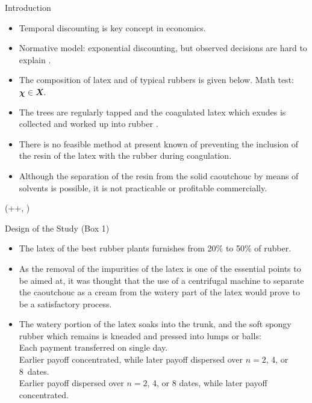 \documentclass{beamer}
\newlength{\blockThree}
\newcommand{\balA}[1][1]{BAL$^\mathup{I}_{#1:#1}$\xspace}
\newcommand{\unbalA}[1][n]{UNBAL$^\mathup{I}_{1:#1}$\xspace}
\newcommand{\balB}[1][1]{BAL$^\mathup{II}_{#1:#1}$\xspace}
\newcommand{\unbalB}[1][n]{UNBAL$^\mathup{II}_{#1:1}$\xspace}
\begin{document}
\begin{frame}[t]
\begin{textblock*}{\colwidth}
\begin{block}{Introduction}
\vspace{-0.333333\baselineskip}
\begin{itemize}
	\item Temporal discounting is key concept in economics.
	\item Normative model: exponential discounting, but observed decisions are hard to explain \citep[e.g.,][]{Dohmen2012}.
	\item The composition of latex and of typical rubbers is given below. Math test: $\mathbfit{\chi} \in \mathbfit{X}$.
	\item The trees are regularly tapped and the coagulated latex which exudes is collected and worked up into rubber \citep{Koszegi2013}.
	\item There is no feasible method at present known of preventing the inclusion of the resin of the latex with the rubber during coagulation.
	\item Although the separation of the resin from the solid caoutchouc by means of solvents is possible, it is not practicable or profitable commercially.
\end{itemize}
\end{block}

\end{textblock*}




\begin{textblock*}{\colwidth}(\leftmargin+\colwidth+\colsep, \blockThree)

\begin{block}{Design of the Study {\mdseries(Box 1)}}
\vspace{-0.333333\baselineskip}
\begin{itemize}
	\item The latex of the best rubber plants furnishes from 20\% to 50\% of rubber.
	\item As the removal of the impurities of the latex is one of the essential points to be aimed at, it was thought that the use of a centrifugal machine to separate the caoutchouc as a cream from the watery part of the latex would prove to be a satisfactory process.
	\item The watery portion of the latex soaks into the trunk, and the soft spongy rubber which remains is kneaded and pressed into lumps or balls: \\[0.333333\baselineskip]
	\highlight{\balA, \balB:} Each payment transferred on single day. \\[0.333333\baselineskip]
	\highlight{\unbalA:} Earlier payoff concentrated, while later payoff dispersed over ${n = 2}$, 4, or 8~dates. \\[0.333333\baselineskip]
	\highlight{\unbalB:} Earlier payoff dispersed over ${n = 2}$, 4, or 8 dates, while later payoff concentrated.
\end{itemize}
\end{block}


\end{textblock*}
\end{frame}
\end{document}
